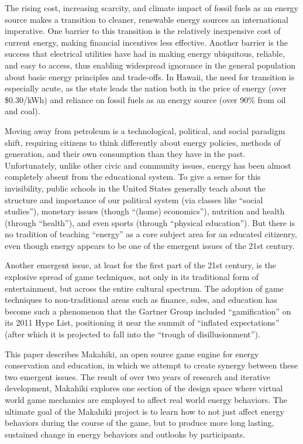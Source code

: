 \documentclass{acm_proc_article-sp}
\begin{document}
The rising cost, increasing scarcity, and climate impact of fossil fuels as
an energy source makes a transition to cleaner, renewable energy sources an
international imperative.  One barrier to this transition is the relatively
inexpensive cost of current energy, making financial incentives less
effective.  Another barrier is the success that electrical utilities have
had in making energy ubiquitous, reliable, and easy to access, thus
enabling widespread ignorance in the general population about basic energy
principles and trade-offs.  In Hawaii, the need for transition is
especially acute, as the state leads the nation both in the price of energy
(over \$0.30/kWh) and reliance on fossil fuels as an energy source (over
90\% from oil and coal).

Moving away from petroleum is a technological, political, and social
paradigm shift, requiring citizens to think differently about energy
policies, methods of generation, and their own consumption than they have
in the past.  Unfortunately, unlike other civic and community issues,
energy has been almost completely absent from the educational system. To
give a sense for this invisibility, public schools in the United States
generally teach about the structure and importance of our political system
(via classes like ``social studies''), monetary issues (though ``(home)
economics''), nutrition and health (through ``health''), and even sports
(through ``physical education'').  But there is no tradition of teaching
``energy'' as a core subject area for an educated citizenry, even though energy
appears to be one of the emergent issues of the 21st century.

Another emergent issue, at least for the first part of the 21st
century, is the explosive spread of game techniques, not only in its
traditional form of entertainment, but across the entire cultural spectrum.
The adoption of game techniques to non-traditional areas such as finance,
sales, and education has become such a phenomenon that the Gartner Group
included ``gamification''\cite{Deterding2011mt} on its 2011 Hype List, 
positioning it near the summit of ``inflated expectations'' 
(after which it is projected to fall into the ``trough of disillusionment''). 

This paper describes Makahiki, an open source game engine for energy
conservation and education, in which we attempt to create synergy between
these two emergent issues.  The result of over two years of research and
iterative development, Makahiki explores one section of the design space
where virtual world game mechanics are employed to affect real world energy
behaviors.  The ultimate goal of the Makahiki project is to learn how to
not just affect energy behaviors during the course of the game, but to
produce more long lasting, sustained change in energy behaviors and
outlooks by participants. 
\end{document}
